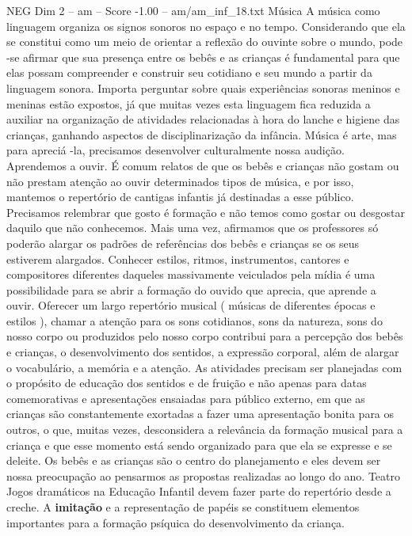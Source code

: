 \begin{textsample}{NEG Dim 2 – am – Score -1.00 – am/am\_inf\_18.txt}  \label{ex:f2_neg_138}
Música A música como linguagem organiza os signos sonoros no espaço e no tempo.
Considerando que ela se constitui como um meio de orientar a reflexão do ouvinte sobre o mundo, pode -se afirmar que sua presença entre os bebês e as crianças é fundamental para que elas possam compreender e construir seu cotidiano e seu mundo a partir da linguagem sonora.
Importa perguntar sobre quais experiências sonoras meninos e meninas estão expostos, já que muitas vezes esta linguagem fica reduzida a auxiliar na organização de atividades relacionadas à hora do lanche e higiene das crianças, ganhando aspectos de disciplinarização da infância.
Música é arte, mas para apreciá -la, precisamos desenvolver culturalmente nossa audição.
Aprendemos a ouvir.
É comum relatos de que os bebês e crianças não gostam ou não prestam atenção ao ouvir determinados tipos de música, e por isso, mantemos o repertório de cantigas infantis já destinadas a esse público.
Precisamos relembrar que gosto é formação e não temos como gostar ou desgostar daquilo que não conhecemos.
Mais uma vez, afirmamos que os professores só poderão alargar os padrões de referências dos bebês e crianças se os seus estiverem alargados.
Conhecer estilos, ritmos, instrumentos, cantores e compositores diferentes daqueles massivamente veiculados pela mídia é uma possibilidade para se abrir a formação do ouvido que aprecia, que aprende a ouvir.
Oferecer um largo repertório musical ( músicas de diferentes épocas e estilos ), chamar a atenção para os sons cotidianos, sons da natureza, sons do nosso corpo ou produzidos pelo nosso corpo contribui para a percepção dos bebês e crianças, o desenvolvimento dos sentidos, a expressão corporal, além de alargar o vocabulário, a memória e a atenção.
As atividades precisam ser planejadas com o propósito de educação dos sentidos e de fruição e não apenas para datas comemorativas e apresentações ensaiadas para público externo, em que as crianças são constantemente exortadas a fazer uma apresentação bonita para os outros, o que, muitas vezes, desconsidera a relevância da formação musical para a criança e que esse momento está sendo organizado para que ela se expresse e se deleite.
Os bebês e as crianças são o centro do planejamento e eles devem ser nossa preocupação ao pensarmos as propostas realizadas ao longo do ano.
Teatro Jogos dramáticos na Educação Infantil devem fazer parte do repertório desde a creche.
A \textbf{imitação} e a representação de papéis se constituem elementos importantes para a formação psíquica do desenvolvimento da criança.

\end{textsample}
